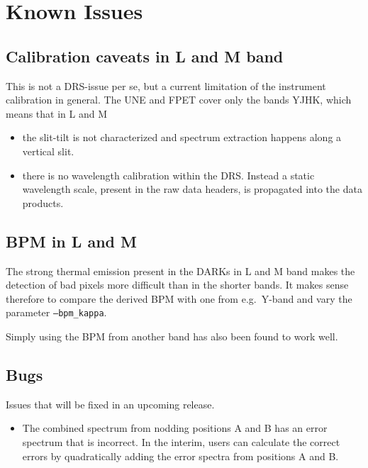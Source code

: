 \section{Known Issues}
\label{sec:knownissues}


\subsection{Calibration caveats in L and M band}

This is not a DRS-issue per se, but a current limitation of the instrument calibration in general. The UNE and FPET cover only the bands YJHK, which means that in L and M
\begin{itemize}
    \item the slit-tilt is not characterized and spectrum extraction happens along a vertical slit.
    \item there is no wavelength calibration within the DRS. Instead a static wavelength scale, present in the raw data headers, is propagated into the data products.
\end{itemize}


\subsection{BPM in L and M}

The strong thermal emission present in the DARKs in L and M band makes the detection of bad pixels more difficult than in the shorter bands. It makes sense therefore to compare the derived BPM with one from e.g.~Y-band and vary the parameter \texttt{--bpm\_kappa}.

Simply using the BPM from another band has also been found to work well.

\subsection{Bugs}
Issues that will be fixed in an upcoming release.

\begin{itemize}
    \item The combined spectrum from nodding positions A and B has an error
    spectrum that is incorrect. In the interim, users can calculate  the correct
    errors by quadratically adding the error spectra from positions A and B.
\end{itemize}